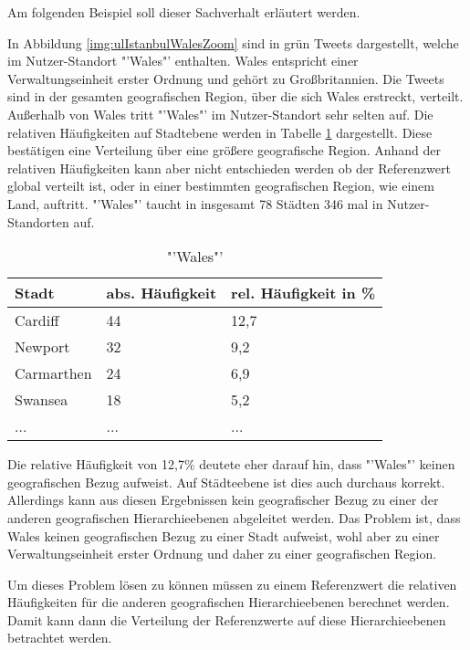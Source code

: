 			Am folgenden Beispiel soll dieser Sachverhalt erläutert werden.

			In Abbildung \ref{img:ulIstanbulWalesZoom} sind in grün Tweets dargestellt, welche im Nutzer-Standort "'Wales"' enthalten.
			Wales entspricht einer Verwaltungseinheit erster Ordnung und gehört zu Großbritannien.
			Die Tweets sind in der gesamten geografischen Region, über die sich Wales erstreckt, verteilt.
			Außerhalb von Wales tritt "'Wales"' im Nutzer-Standort sehr selten auf.
			Die relativen Häufigkeiten auf Stadtebene werden in Tabelle \ref{tab:walesCity} dargestellt.
			Diese bestätigen eine Verteilung über eine größere geografische Region.
			Anhand der relativen Häufigkeiten kann aber nicht entschieden werden ob der Referenzwert global verteilt ist, oder in einer bestimmten geografischen Region, wie einem Land, auftritt. 
			"'Wales"' taucht in insgesamt 78 Städten 346 mal in Nutzer-Standorten auf.

			\begin{table}[h]
			\centering
			\caption{"'Wales"'}
			\label{tab:walesCity}
			\begin{tabular}{|l|l|l|}
			\hline
			Stadt      & abs. Häufigkeit & rel. Häufigkeit in \% \\ \hline \hline
			Cardiff    & 44 			 & 12,7 \\ \hline
			Newport    & 32 			 & 9,2  \\ \hline
			Carmarthen & 24 			 & 6,9  \\ \hline
			Swansea    & 18 			 & 5,2  \\ \hline
			...    & ... & ...  \\ \hline
			\end{tabular}
			\end{table}

			Die relative Häufigkeit von 12,7\% deutete eher darauf hin, dass "'Wales"' keinen geografischen Bezug aufweist.
			Auf Städteebene ist dies auch durchaus korrekt. 
			Allerdings kann aus diesen Ergebnissen kein geografischer Bezug zu einer der anderen geografischen Hierarchieebenen abgeleitet werden.
			Das Problem ist, dass Wales keinen geografischen Bezug zu einer Stadt aufweist, wohl aber zu einer Verwaltungseinheit erster Ordnung und daher zu einer geografischen Region. 

			Um dieses Problem lösen zu können müssen zu einem Referenzwert die relativen Häufigkeiten für die anderen geografischen Hierarchieebenen berechnet werden.
			Damit kann dann die Verteilung der Referenzwerte auf diese Hierarchieebenen betrachtet werden.
			
